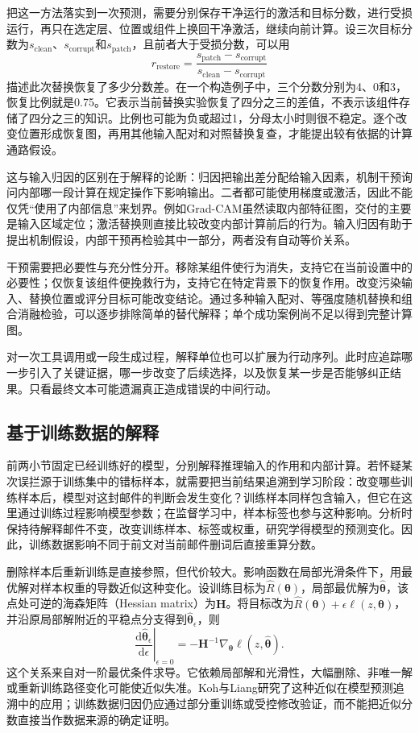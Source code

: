 把这一方法落实到一次预测，需要分别保存干净运行的激活和目标分数，进行受损运行，再只在选定层、位置或组件上换回干净激活，继续向前计算。设三次目标分数为$s_{\mathrm{clean}}$、$s_{\mathrm{corrupt}}$和$s_{\mathrm{patch}}$，且前者大于受损分数，可以用
\begin{equation}
 r_{\mathrm{restore}}
 =\frac{s_{\mathrm{patch}}-s_{\mathrm{corrupt}}}
        {s_{\mathrm{clean}}-s_{\mathrm{corrupt}}}
 \label{eq:interpretability-restoration}
\end{equation}
描述此次替换恢复了多少分数差。在一个构造例子中，三个分数分别为4、0和3，恢复比例就是0.75。它表示当前替换实验恢复了四分之三的差值，不表示该组件存储了四分之三的知识。比例也可能为负或超过1，分母太小时则很不稳定。逐个改变位置形成恢复图，再用其他输入配对和对照替换复查，才能提出较有依据的计算通路假设。

这与输入归因的区别在于解释的论断：归因把输出差分配给输入因素，机制干预询问内部哪一段计算在规定操作下影响输出。二者都可能使用梯度或激活，因此不能仅凭“使用了内部信息”来划界。例如Grad-CAM虽然读取内部特征图，交付的主要是输入区域定位；激活替换则直接比较改变内部计算前后的行为。输入归因有助于提出机制假设，内部干预再检验其中一部分，两者没有自动等价关系。

干预需要把必要性与充分性分开。移除某组件使行为消失，支持它在当前设置中的必要性；仅恢复该组件便挽救行为，支持它在特定背景下的恢复作用。改变污染输入、替换位置或评分目标可能改变结论。通过多种输入配对、等强度随机替换和组合消融检验，可以逐步排除简单的替代解释；单个成功案例尚不足以得到完整计算图。

对一次工具调用或一段生成过程，解释单位也可以扩展为行动序列。此时应追踪哪一步引入了关键证据，哪一步改变了后续选择，以及恢复某一步是否能够纠正结果。只看最终文本可能遗漏真正造成错误的中间行动。

\subsection{基于训练数据的解释}
\label{sec:interpretability-local-training}

前两小节固定已经训练好的模型，分别解释推理输入的作用和内部计算。若怀疑某次误拦源于训练集中的错标样本，就需要把当前结果追溯到学习阶段：改变哪些训练样本后，模型对这封邮件的判断会发生变化？训练样本同样包含输入，但它在这里通过训练过程影响模型参数；在监督学习中，样本标签也参与这种影响。分析时保持待解释邮件不变，改变训练样本、标签或权重，研究学得模型的预测变化。因此，训练数据影响不同于前文对当前邮件删词后直接重算分数。

删除样本后重新训练是直接参照，但代价较大。影响函数在局部光滑条件下，用最优解对样本权重的导数近似这种变化。设训练目标为$\hat R(\bm{\theta})$，局部最优解为$\hat{\bm{\theta}}$，该点处可逆的海森矩阵（Hessian matrix）为$\bm H$。将目标改为$\hat R(\bm{\theta})+\epsilon\ell(z,\bm{\theta})$，并沿原局部解附近的平稳点分支得到$\hat{\bm{\theta}}_\epsilon$，则
\[
 \left.\frac{\mathrm d\hat{\bm{\theta}}_\epsilon}
 {\mathrm d\epsilon}\right|_{\epsilon=0}
 =-\bm H^{-1}\nabla_{\bm{\theta}}
       \ell(z,\hat{\bm{\theta}}).
\]
这个关系来自对一阶最优条件求导。它依赖局部解和光滑性，大幅删除、非唯一解或重新训练路径变化可能使近似失准。Koh与Liang研究了这种近似在模型预测追溯中的应用；训练数据归因仍应通过部分重训练或受控修改验证，而不能把近似分数直接当作数据来源的确定证明。

